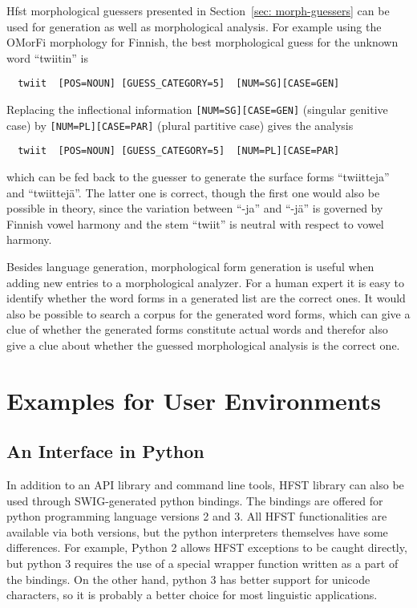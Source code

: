 \documentclass{llncs}
\begin{document}
Hfst morphological guessers presented in Section~\ref{sec:
  morph-guessers} can be used for generation as well as morphological
analysis. For example using the OMorFi morphology for Finnish, the
best morphological guess for the unknown word ``twiitin'' is
\begin{verbatim}
  twiit  [POS=NOUN] [GUESS_CATEGORY=5]  [NUM=SG][CASE=GEN]
\end{verbatim}
Replacing the inflectional information {\tt [NUM=SG][CASE=GEN]}
(singular genitive case) by {\tt [NUM=PL][CASE=PAR]} (plural
partitive case) gives the analysis
\begin{verbatim}
  twiit  [POS=NOUN] [GUESS_CATEGORY=5]  [NUM=PL][CASE=PAR]
\end{verbatim}
which can be fed back to the guesser to generate the surface forms
``twiitteja'' and ``twiittejä''. The latter one is correct, though the
first one would also be possible in theory, since the variation
between ``-ja'' and ``-jä'' is governed by Finnish vowel harmony and
the stem ``twiit'' is neutral with respect to vowel harmony.

Besides language generation, morphological form generation is useful
when adding new entries to a morphological analyzer. For a human
expert it is easy to identify whether the word forms in a generated
list are the correct ones. It would also be possible to search a
corpus for the generated word forms, which can give a clue of whether
the generated forms constitute actual words and therefor also give a
clue about whether the guessed morphological analysis is the correct
one.

\section{Examples for User Environments}

\subsection{An Interface in Python}

In addition to an API library and command line tools, HFST library can
also be used through SWIG-generated python bindings. The bindings are
offered for python programming language versions 2 and 3. All HFST
functionalities are available via both versions, but the python
interpreters themselves have some differences. For example, Python 2
allows HFST exceptions to be caught directly, but python 3 requires
the use of a special wrapper function written as a part of the
bindings. On the other hand, python 3 has better support for unicode
characters, so it is probably a better choice for most linguistic
applications.
\end{document}

